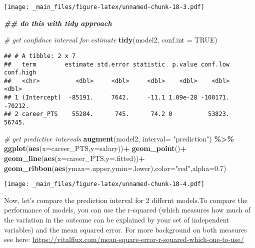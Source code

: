 \documentclass[
]{book}
\newenvironment{Shaded}{\begin{snugshade}}{\end{snugshade}}
\newcommand{\AttributeTok}[1]{\textcolor[rgb]{0.13,0.29,0.53}{#1}}
\newcommand{\CommentTok}[1]{\textcolor[rgb]{0.56,0.35,0.01}{\textit{#1}}}
\newcommand{\ConstantTok}[1]{\textcolor[rgb]{0.56,0.35,0.01}{#1}}
\newcommand{\DocumentationTok}[1]{\textcolor[rgb]{0.56,0.35,0.01}{\textbf{\textit{#1}}}}
\newcommand{\FloatTok}[1]{\textcolor[rgb]{0.00,0.00,0.81}{#1}}
\newcommand{\FunctionTok}[1]{\textcolor[rgb]{0.13,0.29,0.53}{\textbf{#1}}}
\newcommand{\NormalTok}[1]{#1}
\newcommand{\SpecialCharTok}[1]{\textcolor[rgb]{0.81,0.36,0.00}{\textbf{#1}}}
\newcommand{\StringTok}[1]{\textcolor[rgb]{0.31,0.60,0.02}{#1}}
\begin{document}
\texttt{[image: \_main\_files/figure-latex/unnamed-chunk-18-3.pdf]}

\begin{Shaded}
\begin{Highlighting}[]
\DocumentationTok{\#\# do this with tidy approach}

\CommentTok{\# get confidnce interval for estimate}
\FunctionTok{tidy}\NormalTok{(model2, }\AttributeTok{conf.int =} \ConstantTok{TRUE}\NormalTok{)}
\end{Highlighting}
\end{Shaded}

\begin{verbatim}
## # A tibble: 2 x 7
##   term        estimate std.error statistic  p.value conf.low conf.high
##   <chr>          <dbl>     <dbl>     <dbl>    <dbl>    <dbl>     <dbl>
## 1 (Intercept)  -85191.     7642.     -11.1 1.09e-28 -100171.   -70212.
## 2 career_PTS    55284.      745.      74.2 0          53823.    56745.
\end{verbatim}

\begin{Shaded}
\begin{Highlighting}[]
\CommentTok{\# get predictive intervals}
\FunctionTok{augment}\NormalTok{(model2, }\AttributeTok{interval=} \StringTok{"prediction"}\NormalTok{) }\SpecialCharTok{\%\textgreater{}\%}
  \FunctionTok{ggplot}\NormalTok{(}\FunctionTok{aes}\NormalTok{(}\AttributeTok{x=}\NormalTok{career\_PTS,}\AttributeTok{y=}\NormalTok{salary))}\SpecialCharTok{+}
  \FunctionTok{geom\_point}\NormalTok{()}\SpecialCharTok{+}
  \FunctionTok{geom\_line}\NormalTok{(}\FunctionTok{aes}\NormalTok{(}\AttributeTok{x=}\NormalTok{career\_PTS,}\AttributeTok{y=}\NormalTok{.fitted))}\SpecialCharTok{+}
  \FunctionTok{geom\_ribbon}\NormalTok{(}\FunctionTok{aes}\NormalTok{(}\AttributeTok{ymax=}\NormalTok{.upper,}\AttributeTok{ymin=}\NormalTok{.lower),}\AttributeTok{color=}\StringTok{"red"}\NormalTok{,}\AttributeTok{alpha=}\FloatTok{0.7}\NormalTok{)}
\end{Highlighting}
\end{Shaded}

\texttt{[image: \_main\_files/figure-latex/unnamed-chunk-18-4.pdf]}

Now, let's compare the prediction interval for 2 differnt models.To compare the performance of models, you can use the r-squared (which measures how much of the variation in the outcome can be explained by your set of independent variables) and the mean squared error. For more background on both measures see here: \url{https://vitalflux.com/mean-square-error-r-squared-which-one-to-use/}
\end{document}
